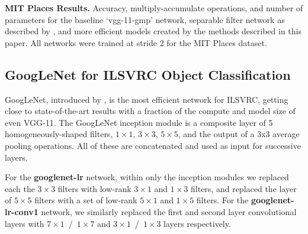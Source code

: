 \documentclass[thesis]{subfiles}
\begin{document}
    \begin{table}[htbp]
        \centering
        \data
        \pgfplotstabletypeset[
        every head row/.style={
            before row=\toprule,after row=\midrule},
        every last row/.style={
            after row=\bottomrule},
        fixed zerofill,     %
        columns={Network, Stride, Multiply-Acc., Param., Top-1 Acc., Top-5 Acc.},
        column type/.add={lrrrrrr}{},
        columns/Multiply-Acc./.style={
            column name=Multiple-Acc. {\small $\times 10^{8}$},
            preproc/expr={{##1/1e8}}
        },
        columns/Param./.style={
            column name=Param. {\small $\times 10^{7}$},
            preproc/expr={{##1/1e7}}
        },
        columns/Network/.style={string type},
        columns/Stride/.style={precision=0},
        columns/Top-1 Acc./.style={precision=3},
        columns/Top-5 Acc./.style={precision=3},
        highlight col max ={\data}{Top-1 Acc.},
        highlight col max ={\data}{Top-5 Acc.}, 
        highlight col min ={\data}{Param.}, 
        highlight col min ={\data}{Multiply-Acc.}, 
        col sep=comma]{\data}
        \caption[MIT Places results]{{\bf MIT Places Results.} Accuracy, multiply-accumulate operations, and number of parameters for the baseline `vgg-11-gmp' network, separable filter network as described by \citet{journals/corr/JaderbergVZ14}, and more efficient models created by the methods described in this paper. All networks were trained at stride 2 for the MIT Places dataset.
        }
        \label{table:placesresults}
    \end{table}
    
    
    \subsection{GoogLeNet for ILSVRC Object Classification}
    GoogLeNet, introduced by \citet{journals/corr/SzegedyLJSRAEVR14}, is the most efficient network for ILSVRC, getting close to state-of-the-art results with a fraction of the compute and model size of even VGG-11. The GoogLeNet inception module is a composite layer of 5 homogeneously-shaped filters, $1\times 1$, $3\times 3$, $5\times 5$, and the output of a 3x3 average pooling operations. All of these are concatenated and used as input for successive layers. 
    
    For the \textbf{googlenet-lr} network, within only the inception modules we replaced each the $3\times 3$ filters with low-rank $3 \times 1$ and $1\times 3$ filters, and replaced the layer of $5\times 5$ filters with a set of low-rank $5 \times 1$ and $1\times 5$ filters. For the \textbf{googlenet-lr-conv1} network, we similarly replaced the first and second layer convolutional layers with $7 \times 1$~/~$1\times 7$ and $3 \times 1$~/~$1\times 3$ layers respectively.
    
\end{document}
